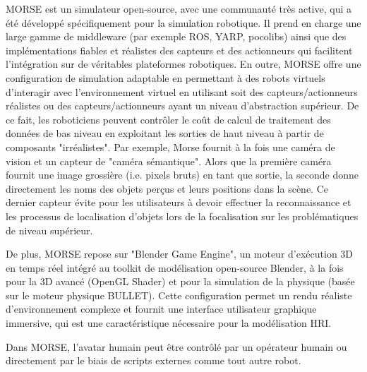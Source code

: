 \documentclass[a4paper,11pt,twoside]{StyleThese}
\begin{document}
MORSE est un simulateur open-source, avec une communauté très active, qui a été développé spécifiquement pour la simulation robotique. Il prend en charge une large gamme de middleware (par exemple ROS, YARP, pocolibs) ainsi que des implémentations fiables et réalistes des capteurs et des actionneurs qui facilitent l'intégration sur de véritables plateformes robotiques.
En outre, MORSE offre une configuration de simulation adaptable en permettant à des robots virtuels d'interagir avec l'environnement virtuel en utilisant soit des capteurs/actionneurs réalistes ou des capteurs/actionneurs ayant un niveau d'abstraction supérieur. De ce fait, les roboticiens peuvent contrôler le coût de calcul de traitement des données de bas niveau en exploitant les sorties de haut niveau à partir de composants "irréalistes".
%
Par exemple, Morse fournit à la fois une caméra de vision et
un capteur de "caméra sémantique". Alors que la première caméra fournit une image grossière (i.e. pixels bruts) en tant que sortie, la seconde
donne directement les noms des objets perçus et leurs positions dans la scène.
Ce dernier capteur évite pour les utilisateurs à devoir effectuer la reconnaissance et les processus de localisation d'objets lors de la focalisation sur les problématiques de niveau supérieur.

De plus, MORSE repose sur "Blender Game Engine",
un moteur d'exécution 3D en temps réel intégré au toolkit de modélisation open-source Blender, à la fois pour la 3D avancé (OpenGL Shader) et
pour la simulation de la physique (basée sur le moteur physique BULLET).
Cette configuration permet un rendu réaliste d'environnement complexe et fournit une interface utilisateur graphique immersive, qui est une caractéristique nécessaire %
pour la modélisation HRI.

Dans MORSE, l'avatar humain peut être contrôlé par un opérateur humain ou directement par le biais de scripts externes comme tout autre robot.


\end{document}
